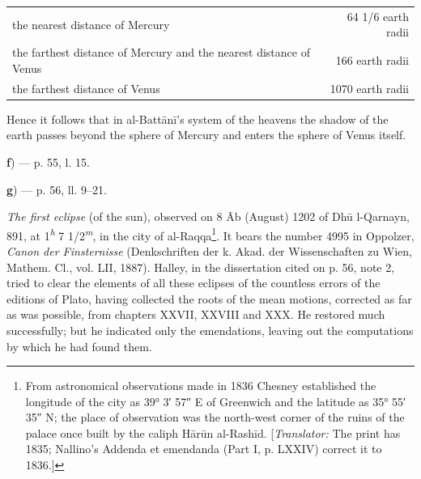 \documentclass[11pt]{article}
\newcommand{\Pg}[1]{\marginpar{\footnotesize\color{gray}#1}}
\begin{document}
\begin{center}\small\begin{tabular}{lr}
the nearest distance of Mercury & 64 1/6 earth radii \\
the farthest distance of Mercury and the nearest distance of Venus & 166 earth radii \\
the farthest distance of Venus & 1070 earth radii \\
\end{tabular}\end{center}
\par Hence it follows that in al-Battānī's system of the heavens the shadow of the earth passes beyond the sphere of Mercury and enters the sphere of Venus itself.\par
\par\begin{center}\textbf{f}) — p. 55, l. 15.\end{center}
\par [Mercury and Venus are never seen in opposition to the sun; hence it is understood at once why neither planet can fall into the shadow of the earth. — Schiaparelli.]\par
\par\begin{center}\textbf{g}) — p. 56, ll. 9–21.\end{center}
\par \Pg{I 227}\emph{The first eclipse} (of the sun), observed on 8 Āb (August) 1202 of Dhū l-Qarnayn, 891, at 1\textsuperscript{\itshape h} 7 1/2\textsuperscript{\itshape m}, in the city of al-Raqqa\footnote{From astronomical observations made in 1836 Chesney established the longitude of the city as 39° 3′ 57″ E of Greenwich and the latitude as 35° 55′ 35″ N; the place of observation was the north-west corner of the ruins of the palace once built by the caliph Hārūn al-Rashīd. [\emph{Translator:} The print has 1835; Nallino's Addenda et emendanda (Part I, p. LXXIV) correct it to 1836.]}. It bears the number 4995 in Oppolzer, \emph{Canon der Finsternisse} (Denkschriften der k. Akad. der Wissenschaften zu Wien, Mathem. Cl., vol. LII, 1887). Halley, in the dissertation cited on p. 56, note 2, tried to clear the elements of all these eclipses of the countless errors of the editions of Plato, having collected the roots of the mean motions, corrected as far as was possible, from chapters XXVII, XXVIII and XXX. He restored much successfully; but he indicated only the emendations, leaving out the computations by which he had found them.\par
\end{document}
